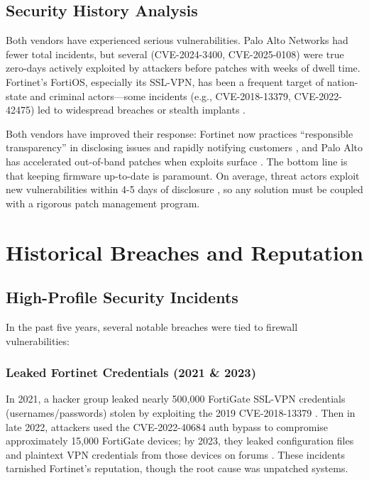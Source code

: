 \documentclass[12pt]{article}
\begin{document}
\subsection{Security History Analysis}

Both vendors have experienced serious vulnerabilities. Palo Alto Networks had fewer total incidents, but several (CVE-2024-3400, CVE-2025-0108) were true zero-days actively exploited by attackers before patches with weeks of dwell time. Fortinet's FortiOS, especially its SSL-VPN, has been a frequent target of nation-state and criminal actors—some incidents (e.g., CVE-2018-13379, CVE-2022-42475) led to widespread breaches or stealth implants \cite{fortinetvuln2023} \cite{bleepingcomputer2025}.

Both vendors have improved their response: Fortinet now practices ``responsible transparency'' in disclosing issues and rapidly notifying customers \cite{fortinetthreat2025}, and Palo Alto has accelerated out-of-band patches when exploits surface \cite{theregister2024}. The bottom line is that keeping firmware up-to-date is paramount. On average, threat actors exploit new vulnerabilities within 4-5 days of disclosure \cite{cisapalo2024}, so any solution must be coupled with a rigorous patch management program.

\section{Historical Breaches and Reputation}

\subsection{High-Profile Security Incidents}

In the past five years, several notable breaches were tied to firewall vulnerabilities:

\subsubsection{Leaked Fortinet Credentials (2021 \& 2023)}
In 2021, a hacker group leaked nearly 500,000 FortiGate SSL-VPN credentials (usernames/passwords) stolen by exploiting the 2019 CVE-2018-13379 \cite{bleepingcomputer2022}. Then in late 2022, attackers used the CVE-2022-40684 auth bypass to compromise approximately 15,000 FortiGate devices; by 2023, they leaked configuration files and plaintext VPN credentials from those devices on forums \cite{securityweek2022}. These incidents tarnished Fortinet's reputation, though the root cause was unpatched systems.
\end{document}
